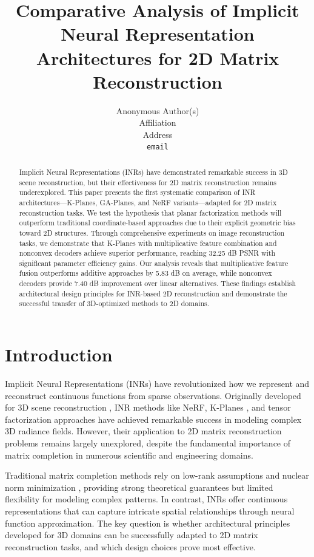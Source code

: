 \documentclass{article}
\title{Comparative Analysis of Implicit Neural Representation Architectures for 2D Matrix Reconstruction}
\author{
  Anonymous Author(s) \\
  Affiliation \\
  Address \\
  \texttt{email}
}
\begin{document}
\maketitle

\begin{abstract}
Implicit Neural Representations (INRs) have demonstrated remarkable success in 3D scene reconstruction, but their effectiveness for 2D matrix reconstruction remains underexplored. This paper presents the first systematic comparison of INR architectures—K-Planes, GA-Planes, and NeRF variants—adapted for 2D matrix reconstruction tasks. We test the hypothesis that planar factorization methods will outperform traditional coordinate-based approaches due to their explicit geometric bias toward 2D structures. Through comprehensive experiments on image reconstruction tasks, we demonstrate that K-Planes with multiplicative feature combination and nonconvex decoders achieve superior performance, reaching 32.25 dB PSNR with significant parameter efficiency gains. Our analysis reveals that multiplicative feature fusion outperforms additive approaches by 5.83 dB on average, while nonconvex decoders provide 7.40 dB improvement over linear alternatives. These findings establish architectural design principles for INR-based 2D reconstruction and demonstrate the successful transfer of 3D-optimized methods to 2D domains.
\end{abstract}

\section{Introduction}

Implicit Neural Representations (INRs) have revolutionized how we represent and reconstruct continuous functions from sparse observations. Originally developed for 3D scene reconstruction \citep{mildenhall2020nerf}, INR methods like NeRF, K-Planes \citep{fridovich2023kplanes}, and tensor factorization approaches \citep{chen2022tensorf} have achieved remarkable success in modeling complex 3D radiance fields. However, their application to 2D matrix reconstruction problems remains largely unexplored, despite the fundamental importance of matrix completion in numerous scientific and engineering domains.

Traditional matrix completion methods rely on low-rank assumptions and nuclear norm minimization \citep{candes2009matrix, recht2011simpler}, providing strong theoretical guarantees but limited flexibility for modeling complex patterns. In contrast, INRs offer continuous representations that can capture intricate spatial relationships through neural function approximation. The key question is whether architectural principles developed for 3D domains can be successfully adapted to 2D matrix reconstruction tasks, and which design choices prove most effective.
\end{document}
